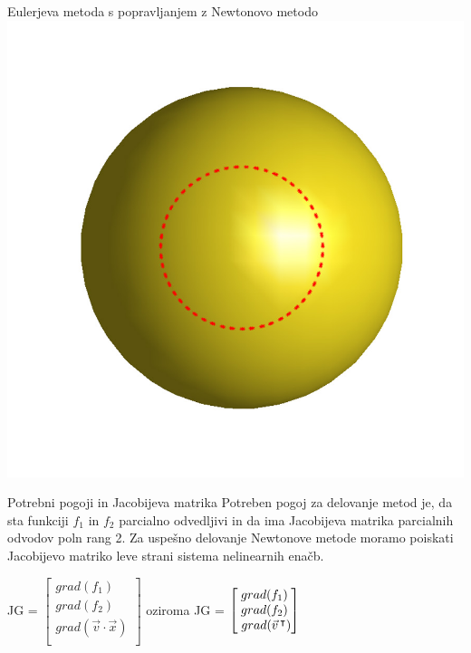 \documentclass{beamer}
\begin{document}
\begin{frame}{Eulerjeva metoda s popravljanjem z Newtonovo metodo}
		\includegraphics[scale=0.2]{eul3_newt}
		
	\end{frame}
	
	\begin{frame}{Potrebni pogoji in Jacobijeva matrika}
		Potreben pogoj za delovanje metod je, da sta funkciji $f_{1}$ in $f_{2}$ parcialno odvedljivi in da ima Jacobijeva matrika parcialnih odvodov poln rang 2. Za uspešno delovanje Newtonove metode moramo poiskati Jacobijevo matriko leve strani sistema nelinearnih enačb.
		
		\begin{center}
			JG = $\begin{bmatrix}
			grad(f_{1}) \\
			grad(f_{2}) \\
			grad(\vec{v} \cdot \vec{x}) \\
			\end{bmatrix}$
			oziroma
			JG = $\begin{bmatrix}
			grad(f_{1}) \\
			grad(f_{2}) \\
			\hspace{1mm}grad(\vec{v}\hspace{0.5mm}^\intercal) \\
			\end{bmatrix}$
		\end{center}
	\end{frame}
	
\end{document}
